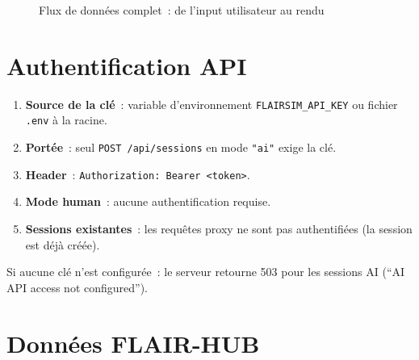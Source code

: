 \documentclass[a4paper, 11pt, french]{article}
\newcommand{\code}[1]{\texttt{#1}}
\begin{document}
\begin{figure}[H]
\caption{Flux de données complet~: de l'input utilisateur au rendu}
\label{fig:dataflow}
\end{figure}

\section{Authentification API}
\label{sec:auth}

\begin{enumerate}
  \item \textbf{Source de la clé}~: variable d'environnement
        \code{FLAIRSIM\_API\_KEY} ou fichier \code{.env} à la racine.
  \item \textbf{Portée}~: seul \code{POST /api/sessions} en mode
        \code{"ai"} exige la clé.
  \item \textbf{Header}~: \code{Authorization: Bearer <token>}.
  \item \textbf{Mode human}~: aucune authentification requise.
  \item \textbf{Sessions existantes}~: les requêtes proxy ne sont pas
        authentifiées (la session est déjà créée).
\end{enumerate}

Si aucune clé n'est configurée~: le serveur retourne 503 pour les
sessions AI (``AI API access not configured'').

\section{Données FLAIR-HUB}
\label{sec:data}
\end{document}
